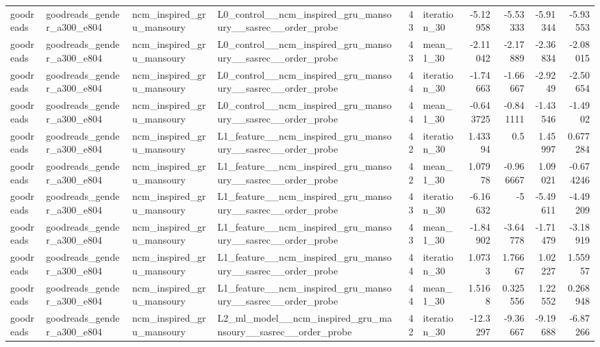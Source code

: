 \begin{table}[htbp!]
\begin{tabular}{llllrlrrrr}
goodreads & goodreads\_gender\_a300\_e804 & ncm\_inspired\_gru\_mansoury & L0\_control\_\_ncm\_inspired\_gru\_mansoury\_\_sasrec\_\_order\_probe & 43 & iteration\_30 & -5.12958 & -5.53333 & -5.91344 & -5.93553 \\
goodreads & goodreads\_gender\_a300\_e804 & ncm\_inspired\_gru\_mansoury & L0\_control\_\_ncm\_inspired\_gru\_mansoury\_\_sasrec\_\_order\_probe & 43 & mean\_1\_30 & -2.11042 & -2.17889 & -2.36834 & -2.08015 \\
goodreads & goodreads\_gender\_a300\_e804 & ncm\_inspired\_gru\_mansoury & L0\_control\_\_ncm\_inspired\_gru\_mansoury\_\_sasrec\_\_order\_probe & 44 & iteration\_30 & -1.74663 & -1.66667 & -2.9249 & -2.50654 \\
goodreads & goodreads\_gender\_a300\_e804 & ncm\_inspired\_gru\_mansoury & L0\_control\_\_ncm\_inspired\_gru\_mansoury\_\_sasrec\_\_order\_probe & 44 & mean\_1\_30 & -0.643725 & -0.841111 & -1.43546 & -1.4902 \\
goodreads & goodreads\_gender\_a300\_e804 & ncm\_inspired\_gru\_mansoury & L1\_feature\_\_ncm\_inspired\_gru\_mansoury\_\_sasrec\_\_order\_probe & 42 & iteration\_30 & 1.43394 & 0.5 & 1.45997 & 0.677284 \\
goodreads & goodreads\_gender\_a300\_e804 & ncm\_inspired\_gru\_mansoury & L1\_feature\_\_ncm\_inspired\_gru\_mansoury\_\_sasrec\_\_order\_probe & 42 & mean\_1\_30 & 1.07978 & -0.966667 & 1.09021 & -0.674246 \\
goodreads & goodreads\_gender\_a300\_e804 & ncm\_inspired\_gru\_mansoury & L1\_feature\_\_ncm\_inspired\_gru\_mansoury\_\_sasrec\_\_order\_probe & 43 & iteration\_30 & -6.16632 & -5 & -5.49611 & -4.49209 \\
goodreads & goodreads\_gender\_a300\_e804 & ncm\_inspired\_gru\_mansoury & L1\_feature\_\_ncm\_inspired\_gru\_mansoury\_\_sasrec\_\_order\_probe & 43 & mean\_1\_30 & -1.84902 & -3.64778 & -1.71479 & -3.18919 \\
goodreads & goodreads\_gender\_a300\_e804 & ncm\_inspired\_gru\_mansoury & L1\_feature\_\_ncm\_inspired\_gru\_mansoury\_\_sasrec\_\_order\_probe & 44 & iteration\_30 & 1.0733 & 1.76667 & 1.02227 & 1.55957 \\
goodreads & goodreads\_gender\_a300\_e804 & ncm\_inspired\_gru\_mansoury & L1\_feature\_\_ncm\_inspired\_gru\_mansoury\_\_sasrec\_\_order\_probe & 44 & mean\_1\_30 & 1.5168 & 0.325556 & 1.22552 & 0.268948 \\
goodreads & goodreads\_gender\_a300\_e804 & ncm\_inspired\_gru\_mansoury & L2\_ml\_model\_\_ncm\_inspired\_gru\_mansoury\_\_sasrec\_\_order\_probe & 42 & iteration\_30 & -12.3297 & -9.36667 & -9.19688 & -6.87266 \\

\end{tabular}
\end{table}
